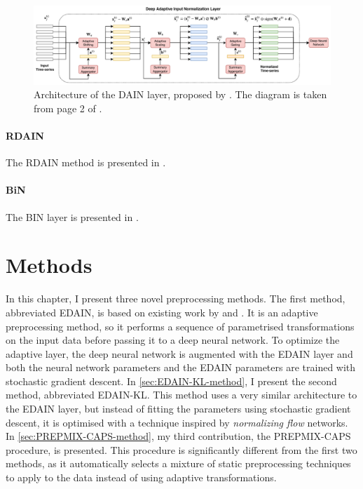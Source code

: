 \documentclass{statsmsc}
\begin{document}
{%
\begin{figure}
\begin{center}
    \includegraphics[width=\textwidth]{diagrams/dain_diagram.pdf}
\end{center}
\caption{Architecture of the \acf{DAIN} layer, proposed by \citeauthor{dain}. The diagram
is taken from page 2 of \citep{dain}.}
\label{fig:dain-arch}
\end{figure}


\subsubsection{RDAIN}%
\label{ssub:RDAIN}

The \ac{RDAIN} method is presented in \cite{rdain}.

\subsubsection{BiN}%
\label{ssub:BiN}

The \ac{BIN} layer is presented in \cite{bin}.




\chapter{Methods} %

In this chapter, I present three novel preprocessing methods. The first method, abbreviated
\acs{EDAIN}, is based on existing work by \citeauthor{dain} and \citeauthor{bin}. It
is an adaptive preprocessing method, so it performs a sequence of parametrised transformations
on the input data before passing it to a deep neural network. To optimize the adaptive layer, 
the deep
neural network is augmented with the \acs{EDAIN} layer and both the neural network parameters
and the \acs{EDAIN} parameters are trained with stochastic gradient descent.
In \cref{sec:EDAIN-KL-method}, I present the second method, abbreviated \acs{EDAIN-KL}.
This method uses a very similar architecture to the \acs{EDAIN} layer, but instead of fitting the
parameters using stochastic gradient descent, it is optimised with a technique inspired by
\textit{normalizing flow} networks. In \cref{sec:PREPMIX-CAPS-method}, my third
contribution, the \acs{PREPMIX-CAPS} procedure, is presented. This procedure is significantly
different from the first two methods, as it automatically selects a mixture of static preprocessing
techniques to apply to the data instead of using adaptive transformations.

}
\end{document}
